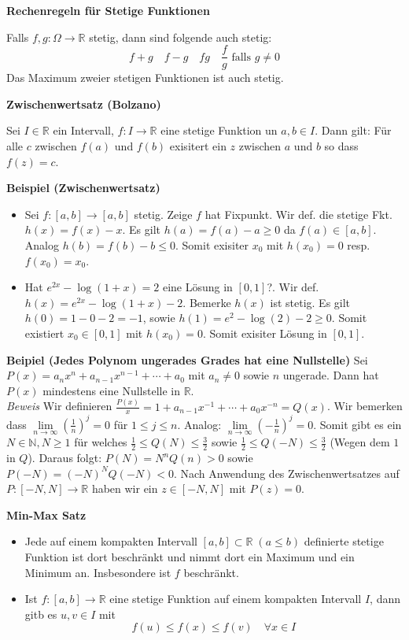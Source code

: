 \documentclass[25pt]{sciposter}
\newcommand{\limm}{\lim\limits_{n \to \infty}}
\newcommand{\R}{\mathbb{R}}
\newcommand{\N}{\mathbb{N}}
\newenvironment{method}[1]{\begin{mdframed}[backgroundcolor=blue!10,innertopmargin=15pt, innerbottommargin=15pt, nobreak=true]
		\textbf{#1 }
	}
	{ 
	\end{mdframed}
}
\begin{document}
\begin{multicols}{3}
\begin{method}{Rechenregeln für Stetige Funktionen}
Falls $f,g:\Omega \to \mathbb{R}$ stetig, dann sind folgende auch stetig:
$$f + g \quad f-g \quad fg \quad \frac{f}{g} \text{ falls } g \not = 0$$
Das Maximum zweier stetigen Funktionen ist auch stetig.
\end{method}

\begin{method}{Zwischenwertsatz (Bolzano)}
	Sei $I \in \R$ ein Intervall, $f: I \to \R$ eine stetige Funktion un $a,b \in I$. Dann gilt: Für alle $c$ zwischen $f(a)$ und $f(b)$ exisitert ein $z$ zwischen $a$ und $b$ so dass $f(z) = c$.
\end{method}

\textbf{Beispiel (Zwischenwertsatz)}
\begin{itemize}
	\item Sei $f:[a,b]\to [a,b]$ stetig. Zeige $f$ hat Fixpunkt. Wir def. die stetige Fkt. $h(x) = f(x)-x$. Es gilt $h(a) = f(a)-a \geq 0$ da $f(a) \in [a,b]$. Analog $h(b) = f(b)-b\leq 0$. Somit exisiter $x_0$ mit $h(x_0) = 0$ resp. $f(x_0) = x_0$.
	\item Hat $e^{2x} - \log (1+x) = 2$ eine Lösung in $[0,1]$?. Wir def. $h(x) = e^{2x} - \log (1+x) -2$. Bemerke $h(x)$ ist stetig. Es gilt $h(0) = 1 - 0 - 2 = -1$, sowie $h(1) = e^2 - \log(2) -2 \geq 0$. Somit existiert $x_0 \in [0,1]$ mit $h(x_0) = 0$. Somit exisiter Lösung in $[0,1]$.
\end{itemize}


\textbf{Beipiel (Jedes Polynom ungerades Grades hat eine Nullstelle)} Sei $P(x) = a_n x^n  + a_{n-1}x^{n-1} + \cdots + a_0$ mit $a_n \not = 0$ sowie $n$ ungerade. Dann hat $P(x)$ mindestens eine Nullstelle in $\R$.\\
\textit{Beweis} Wir definieren $\frac{P(x)}{x} = 1 + a_{n-1}x^{-1} + \cdots + a_0 x^{-n} = Q(x)$. Wir bemerken dass $\limm \left( \frac{1}{n} \right)^j = 0$ für $1\leq j \leq n$. Analog: $\limm \left( - \frac{1}{n} \right)^j = 0$. Somit gibt es ein $N \in \N, N \geq 1$ für welches $\frac{1}{2} \leq Q(N) \leq \frac{3}{2}$ sowie $\frac{1}{2} \leq Q(-N) \leq \frac{3}{2}$ (Wegen dem $1$ in $Q$). Daraus folgt: $P(N) = N^nQ(n) > 0$ sowie $P(-N) = (-N)^N Q(-N) < 0$. Nach Anwendung des Zwischenwertsatzes auf $P:[-N,N] \to \R$ haben wir ein $z \in [-N,N]$ mit $P(z) = 0$.
\begin{method}{Min-Max Satz}
\begin{itemize}
	\item  Jede auf einem kompakten Intervall $\displaystyle [a,b]\subset \mathbb {R} \;(a\leq b) $ definierte stetige Funktion ist dort beschränkt und nimmt dort ein Maximum und ein Minimum an. Insbesondere ist $f$ beschränkt.
	\item Ist ${\displaystyle f\colon [a,b]\to \mathbb {R} }$ eine stetige Funktion auf einem kompakten Intervall $I$, dann gitb es $u,v\in I$ mit $$f(u) \leq f(x) \leq f(v) \quad \forall x \in I$$
	\end{itemize}
\end{method}



\end{multicols}
\end{document}
